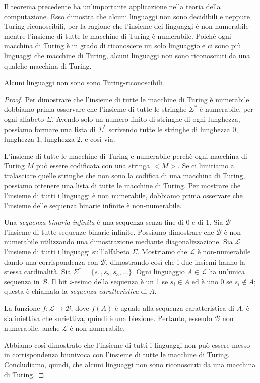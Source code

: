 \documentclass[12pt]{report}
\newcounter{corollary}
\begin{document}
Il teorema precedente ha un'importante applicazione nella teoria della computazione. Esso dimostra che alcuni linguaggi non sono decidibili e neppure Turing riconoscibili, per la ragione che l'insieme dei linguaggi è non numerabile mentre l'insieme di tutte le macchine di Turing è numerabile. Poichè ogni macchina di Turing è in grado di riconoscere un solo linguaggio e ci sono più linguaggi che macchine di Turing, alcuni linguaggi non sono riconosciuti da una qualche macchina di Turing.
\begin{corollary}{}{}
Alcuni linguaggi non sono sono Turing-riconoscibili.
\end{corollary}
\begin{proof}
Per dimostrare che l'insieme di tutte le macchine di Turing è numerabile dobbiamo prima osservare che l'insieme di tutte le stringhe $\Sigma^*$	è numerabile, per ogni alfabeto $\Sigma$. Avendo solo un numero finito di stringhe di ogni lunghezza, possiamo formare una lista di $\Sigma^*$ scrivendo tutte le stringhe di lunghezza 0, lunghezza 1, lunghezza 2, e così via.

L'insieme di tutte le macchine di Turing e numerabile perchè ogni macchina di Turing $M$ può essere codificata con una stringa $<M>$. Se ci limitiamo a tralasciare quelle stringhe che non sono la codifica di una macchina di Turing, possiamo ottenere una lista di tutte le macchine di Turing. Per mostrare che l'insieme di tutti i linguaggi è non  numerabile, dobbiamo prima osservare che l'insieme delle sequenza binarie infinite è non-numerabile.

Una \textit{sequenza binaria infinita} è una sequenza senza fine di 0 e di 1. Sia $\mathcal{B}$ l'insieme di tutte sequenze binarie infinite. Possiamo dimostrare che $\mathcal{B}$ è non numerabile utilizzando una dimostrazione mediante diagonalizzazione. Sia $\mathcal{L}$ l'insieme di tutti i linguaggi sull'alfabeto $\Sigma$. Mostriamo che $\mathcal{L}$ è non-numerabile dando una corrispondenza con $\mathcal{B}$, dimostrando così che i due insiemi hanno la stessa cardinalità. Sia $\Sigma^* = \{s_1, s_2, s_3, \dots\}$. Ogni linguaggio $A \in \mathcal{L}$ ha un'unica sequenza in $\mathcal{B}$. Il bit $i$-esimo della sequenza è un 1 se $s_i \in A$ ed è uno 0 se $s_i \notin A$; questa è chiamata la \textit{sequenza caratteristica} di $A$.

La funzione $f:\mathcal{L} \to \mathcal{B}$, dove $f(A)$ è uguale alla sequenza caratteristica di $A$, è sia iniettiva che suriettiva, quindi è una biezione. Pertanto, essendo $\mathcal{B}$ non numerabile, anche $\mathcal{L}$ è non numerabile.

Abbiamo così dimostrato che l'insieme di tutti i linguaggi non può essere messo in corrispondenza biunivoca con l'insieme di tutte le macchine di Turing. Concludiamo, quindi, che alcuni linguaggi non sono riconosciuti da una macchina di Turing.
\end{proof}
\end{document}
